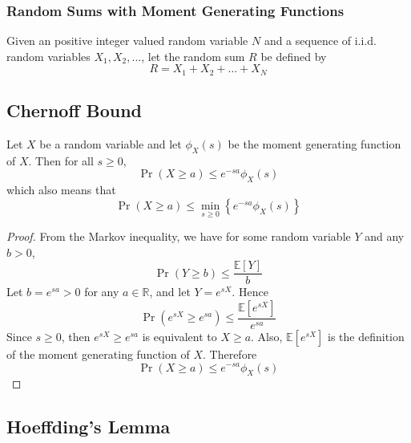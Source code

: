 \documentclass[11pt]{report} %
\begin{document}
\subsubsection{Random Sums with Moment Generating Functions}

Given an positive integer valued random variable $N$ and a sequence of i.i.d. random variables $X_{1}, X_{2}, \dots$, let the random sum $R$ be defined by
\begin{equation}
R = X_{1} +  X_{2} + \dots + X_{N}
\end{equation}

\subsection{Chernoff Bound}

Let $X$ be a random variable and let $\phi_{X}\left(s\right)$ be the moment generating function of $X$. Then for all $s\geq 0$, 
\begin{equation}
\operatorname{Pr}\left(X \geq a\right) \leq e^{-sa}\phi_{X}\left(s\right)
\end{equation}
which also means that 
\begin{equation}
\operatorname{Pr}\left(X \geq a\right) \leq \min_{s\geq 0}\left\{e^{-sa}\phi_{X}\left(s\right)\right\}
\end{equation}
\begin{proof}
From the Markov inequality, we have for some random variable $Y$ and any $b > 0$, 
\begin{equation}
\operatorname{Pr}\left(Y \geq b\right) \leq \dfrac{\mathbb{E}\left[Y\right]}{b}
\end{equation}
Let $b = e^{sa} > 0$ for any $a\in\mathbb{R}$, and let $Y = e^{sX}$. Hence
\begin{equation}
\operatorname{Pr}\left(e^{sX} \geq e^{sa}\right) \leq \dfrac{\mathbb{E}\left[e^{sX}\right]}{e^{sa}}
\end{equation}
Since $s\geq 0$, then $e^{sX} \geq e^{sa}$ is equivalent to $X \geq a$. Also, $\mathbb{E}\left[e^{sX}\right]$ is the definition of the moment generating function of $X$. Therefore
\begin{equation}
\operatorname{Pr}\left(X \geq a\right) \leq e^{-sa}\phi_{X}\left(s\right)
\end{equation}
\end{proof}

\subsection{Hoeffding's Lemma}
\end{document}
